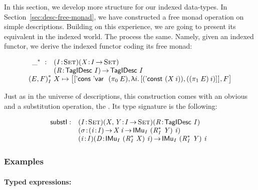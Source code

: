 In this section, we develop more structure for our indexed
data-types. In Section~\ref{sec:desc-free-monad}, we have constructed
a free monad operation on simple descriptions. Building on this
experience, we are going to present its equivalent in the indexed
world. The process the same. Namely, given an indexed functor, we
derive the indexed functor coding its free monad:

\[\stk{
\begin{array}{ll}
\FreeIMonad{\_}{} : & \PITEL{\V{I}}{\Set}
                      \PITEL{\V{X}}{\V{I} \To \Set} \\
                    & \PITEL{\V{R}}{\TagIDesc{I}} \To
                      \TagIDesc{I}
\end{array} \\
\FreeIMonad{(E,F)}{I}{X} \mapsto
    \pair{\pair{\ListCons{\DVar{}}{(\fst{E})}} 
               {\LAM{i}
                \pair{(\DConst{(X\: i)})}
                     {((\snd{E})\: i)}{}}{}}
         {F}{}
}\]

Just as in the universe of descriptions, this construction comes with
an obvious \return and a substitution operation, the \bind. Its type
signature is the following:

\newcommand{\substI}{\F{substI}}

\[
\begin{array}{@{}ll}
\substI : & \PITEL{\V{I}}{\Set}
            \PITEL{\V{X}, \V{Y}}{\V{I} \To \Set}
            \PITEL{\V{R}}{\TagIDesc{\V{I}}} \\
          & \PITEL{\V{\sigma}}{\PI{\V{i}}{\V{I}} \V{X}\:\V{i} \To 
                               \IMu{I}{(\FreeIMonad{\V{R}}{\V{I}}{\V{Y}})}{\V{i}}} \\
          & \PITEL{\V{i}}{\V{I}}
            \PITEL{\V{D}}{\IMu{I}{(\FreeIMonad{\V{R}}{\V{I}}{\V{X}})}{\V{i}}} \To
            \IMu{I}{(\FreeIMonad{\V{R}}{\V{I}}{\V{Y}})}{\V{i}}
\end{array}
\]


\subsubsection{Examples}

\paragraph{Typed expressions:}


